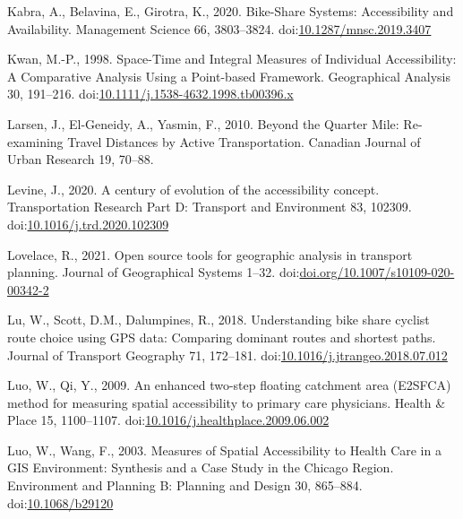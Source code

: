 \documentclass[]{elsarticle} %
\begin{document}
\leavevmode\hypertarget{ref-kabraBikeShareSystemsAccessibility2020}{}%
Kabra, A., Belavina, E., Girotra, K., 2020. Bike-Share Systems:
Accessibility and Availability. Management Science 66, 3803--3824.
doi:\href{https://doi.org/10.1287/mnsc.2019.3407}{10.1287/mnsc.2019.3407}

\leavevmode\hypertarget{ref-kwanSpaceTimeIntegral1998}{}%
Kwan, M.-P., 1998. Space-Time and Integral Measures of Individual
Accessibility: A Comparative Analysis Using a Point-based Framework.
Geographical Analysis 30, 191--216.
doi:\href{https://doi.org/10.1111/j.1538-4632.1998.tb00396.x}{10.1111/j.1538-4632.1998.tb00396.x}

\leavevmode\hypertarget{ref-larsenQuarterMileReexamining2010}{}%
Larsen, J., El-Geneidy, A., Yasmin, F., 2010. Beyond the Quarter Mile:
Re-examining Travel Distances by Active Transportation. Canadian Journal
of Urban Research 19, 70--88.

\leavevmode\hypertarget{ref-levineCenturyEvolutionAccessibility2020}{}%
Levine, J., 2020. A century of evolution of the accessibility concept.
Transportation Research Part D: Transport and Environment 83, 102309.
doi:\href{https://doi.org/10.1016/j.trd.2020.102309}{10.1016/j.trd.2020.102309}

\leavevmode\hypertarget{ref-lovelace2021open}{}%
Lovelace, R., 2021. Open source tools for geographic analysis in
transport planning. Journal of Geographical Systems 1--32.
doi:\href{https://doi.org/doi.org/10.1007/s10109-020-00342-2}{doi.org/10.1007/s10109-020-00342-2}

\leavevmode\hypertarget{ref-luUnderstandingBikeShare2018}{}%
Lu, W., Scott, D.M., Dalumpines, R., 2018. Understanding bike share
cyclist route choice using GPS data: Comparing dominant routes and
shortest paths. Journal of Transport Geography 71, 172--181.
doi:\href{https://doi.org/10.1016/j.jtrangeo.2018.07.012}{10.1016/j.jtrangeo.2018.07.012}

\leavevmode\hypertarget{ref-luoEnhancedTwostepFloating2009}{}%
Luo, W., Qi, Y., 2009. An enhanced two-step floating catchment area
(E2SFCA) method for measuring spatial accessibility to primary care
physicians. Health \& Place 15, 1100--1107.
doi:\href{https://doi.org/10.1016/j.healthplace.2009.06.002}{10.1016/j.healthplace.2009.06.002}

\leavevmode\hypertarget{ref-luoMeasuresSpatialAccessibility2003}{}%
Luo, W., Wang, F., 2003. Measures of Spatial Accessibility to Health
Care in a GIS Environment: Synthesis and a Case Study in the Chicago
Region. Environment and Planning B: Planning and Design 30, 865--884.
doi:\href{https://doi.org/10.1068/b29120}{10.1068/b29120}
\end{document}
